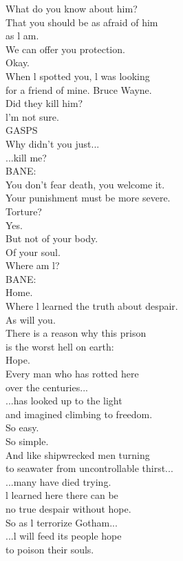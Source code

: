 \documentclass{article}
\begin{document}
\begin{multicols}{3}
What do you know about him?\\
That you should be as afraid of him\\
as l am.\\
We can offer you protection.\\
Okay.\\
When l spotted you, l was looking\\
for a friend of mine. Bruce Wayne.\\
Did they kill him?\\
l'm not sure.\\
GASPS\\
Why didn't you just...\\
...kill me?\\
BANE:\\
You don't fear death, you welcome it.\\
Your punishment must be more severe.\\
Torture?\\
Yes.\\
But not of your body.\\
Of your soul.\\
Where am l?\\
BANE:\\
Home.\\
Where l learned the truth about despair.\\
As will you.\\
There is a reason why this prison\\
is the worst hell on earth:\\
Hope.\\
Every man who has rotted here\\
over the centuries...\\
...has looked up to the light\\
and imagined climbing to freedom.\\
So easy.\\
So simple.\\
And like shipwrecked men turning\\
to seawater from uncontrollable thirst...\\
...many have died trying.\\
l learned here there can be\\
no true despair without hope.\\
So as l terrorize Gotham...\\
...l will feed its people hope\\
to poison their souls.\\

\end{multicols}
\end{document}
